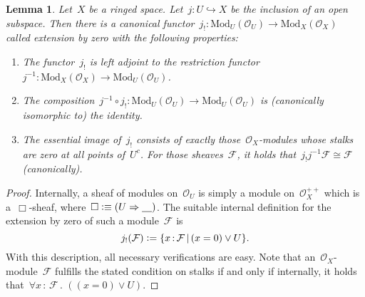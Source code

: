 \documentclass[10pt]{amsart}
\theoremstyle{definition}
\theoremstyle{plain}
\newtheorem{lemma}[defn]{Lemma}
\theoremstyle{remark}
\newcommand{\F}{\mathcal{F}}
\renewcommand{\O}{\mathcal{O}}
\newcommand{\placeholder}{\underline{\quad}}
\newcommand{\Mod}{\mathrm{Mod}}
\newcommand{\?}{\,{:}\,}
\renewcommand{\_}{\mathpunct{.}\,}
\newcommand{\defeq}{\vcentcolon=}
\newcommand{\defequiv}{\vcentcolon\equiv}
\begin{document}
\begin{lemma}\label{lemma:extension-by-zero}
Let~$X$ be a ringed space. Let~$j : U \hookrightarrow X$ be the inclusion
of an open subspace. Then there is a canonical functor~$j_! : \Mod_U(\O_U) \to
\Mod_X(\O_X)$ called \emph{extension by zero} with the following properties:
\begin{enumerate}
\item The functor~$j_!$ is left adjoint to the restriction functor~$j^{-1} :
\Mod_X(\O_X) \to \Mod_U(\O_U)$.
\item The composition~$j^{-1} \circ j_! : \Mod_U(\O_U) \to \Mod_U(\O_U)$ is (canonically
isomorphic to) the identity.
\item The essential image of~$j_!$ consists of exactly those~$\O_X$-modules
whose stalks are zero at all points of~$U^c$. For those sheaves~$\F$, it holds
that~$j_!j^{-1}\F \cong \F$ (canonically).
\end{enumerate}
\end{lemma}
\begin{proof}Internally, a sheaf of modules on~$\O_U$ is simply a module
on~$\O_X^{++}$ which is a~$\Box$-sheaf, where~$\Box \defequiv (U \Rightarrow
\placeholder)$. The suitable internal definition for the extension by zero of
such a module~$\F$ is
\[ j_!(\F) \defeq \{ x\?\F \,|\, (x = 0) \vee U \}. \]
With this description, all necessary verifications are easy. Note that
an~$\O_X$-module~$\F$ fulfills the stated condition on stalks if and only if
internally, it holds that~$\forall x\?\F\_ ((x = 0) \vee U)$.
\end{proof}
\end{document}
